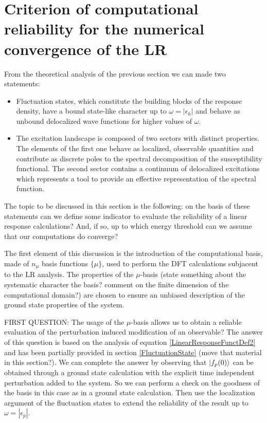 \documentclass[reprint,aps,prb]{revtex4-1}
\newcommand{\eps}{\epsilon}
\begin{document}
\section{Criterion of computational reliability for the numerical convergence of the LR}

From the theoretical analysis of the previous section we can made two statements:
\begin{itemize}
 \item Fluctuation states, which constitute the building blocks of the response density, have a bound state-like character up to $\omega=|\eps_h|$ and behave as unbound delocalized
 wave functions for higher values of $\omega$. 
 \item The excitation landscape is composed of two sectors with distinct properties. The elements of the first one behave as localized, observable quantities and contribute as discrete 
 poles to the spectral decomposition of the susceptibility functional. The second sector contains a continuum of delocalized excitations which represents a tool to provide
 an effective representation of the spectral function. 
\end{itemize}
The topic to be discussed in this section is the following: on the basis of these statements can we define some indicator to evaluate the reliability of a linear response calculations? And, 
if so, up to which energy threshold can we assume that our computations do converge?

The first element of this discussion is the introduction of the computational basis, made of $n_\mu$ basis functions $\{\mu\}$, used to perform the DFT calculations subjacent to the LR analysis. 
The properties of the $\mu$-basis (state something about the systematic character the basis? comment on the finite dimension of the computational domain?) are chosen to ensure an unbiased description 
of the ground state properties of the system. 

FIRST QUESTION: The usage of the $\mu$-basis allows us to obtain a reliable evaluation of the perturbation induced modification of an observable? 
The answer of this question is based on the analysis of equation \eqref{LinearResponseFunctDef2} and has been partially provided in section \ref{FluctuationState} (move that material in this section?). 
We can complete the answer by observing that $\ket{f_p(0)}$ can be obtained through a ground state calculation with the explicit time independent perturbation added to the system. So we can perform
a check on the goodness of the basis in this case as in a ground state calculation. Then use the localization argument of the fluctuation states to extend the reliability of the result up to
$\omega=|\eps_p|$. 
\end{document}
